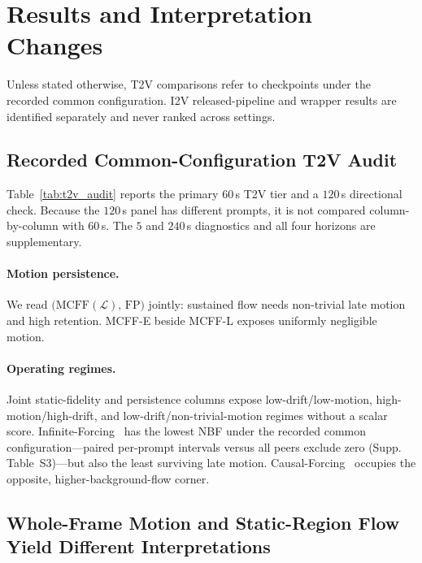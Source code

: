\section{Results and Interpretation Changes}
\label{sec:results}

Unless stated otherwise, T2V comparisons refer to checkpoints under the recorded common configuration. I2V released-pipeline and wrapper results are identified separately and never ranked across settings.

\subsection{Recorded Common-Configuration T2V Audit}
\label{sec:results_t2v}

Table~\ref{tab:t2v_audit} reports the primary $60$\,s T2V tier and a $120$\,s directional check. Because the $120$\,s panel has \SNFnPromptsOneTwenty{} different prompts, it is not compared column-by-column with $60$\,s. The $5$ and $240$\,s diagnostics and all four horizons are supplementary.




\paragraph{Motion persistence.} We read $\bigl(\mathrm{MCFF}(\mathcal{L}),\,\mathrm{FP}\bigr)$ jointly: sustained flow needs non-trivial late motion and high retention. MCFF-E beside MCFF-L exposes uniformly negligible motion.

\paragraph{Operating regimes.} Joint static-fidelity and persistence columns expose low-drift/low-motion, high-motion/high-drift, and low-drift/non-trivial-motion regimes without a scalar score. Infinite-Forcing~\cite{infinite-forcing} has the lowest NBF under the recorded common configuration---paired per-prompt intervals versus all \SNFnPublicTTVPeers{} peers exclude zero (Supp. Table~S3)---but also the least surviving late motion. Causal-Forcing~\cite{zhu2026causal} occupies the opposite, higher-background-flow corner.


\subsection{Whole-Frame Motion and Static-Region Flow Yield Different Interpretations}
\label{sec:results_drift}

